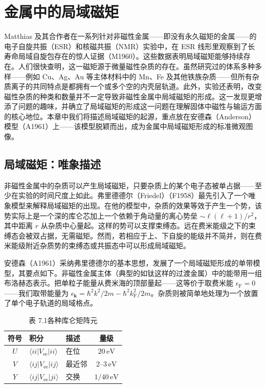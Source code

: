 \chapter{金属中的局域磁矩}

Matthias 及其合作者在一系列针对非磁性金属——即没有永久磁矩的金属——的电子自旋共振（ESR）和核磁共振（NMR）实验中，在 ESR 线形里观察到了长寿命局域自旋包存在的惊人证据（M1960）。这些数据表明局域磁矩能够持续存在。人们很快查明，这一磁矩源于微量磁性杂质的存在。虽然研究过的体系多种多样——例如 Cu、Ag、Au 等主体材料中的 Mn、Fe 及其他铁族杂质——但所有杂质离子的共同特点是都拥有一个或多个空的内壳层轨道。此外，实验还表明，改变磁性杂质的种类和数量并不一定导致非磁性金属中局域磁矩的形成。这一发现更增添了问题的趣味，并确立了局域磁矩的形成这一问题在理解固体中磁性与输运方面的核心地位。本章中我们将描述局域磁矩的起源，重点放在安德森（Anderson）模型（A1961）上——该模型脱颖而出，成为金属中局域磁矩形成的标准微观图像。

\section{局域磁矩：唯象描述}

非磁性金属中的杂质可以产生局域磁矩，只要杂质上的某个电子态被单占据——至少在实验的时间尺度上如此。弗里德德尔（Friedel）（F1958）最先引入了一个唯象模型来解释局域磁矩的出现。在他的模型中，杂质的效果等效于产生一个势，该势实际上是一个深的库仑芯加上一个依赖于角动量的离心势垒 $\sim\ell(\ell+1)/r^{2}$，其中距离 $r$ 从杂质中心量起。这样的势可以支撑束缚态。远在费米能级之下的束缚态会被双占据，无需磁矩。然而，若相应于上、下自旋的能级并不简并，则在费米能级附近杂质势的束缚态或共振态中可以形成局域磁矩。

安德森（A1961）采纳弗里德德尔的基本思想，发展了一个局域磁矩形成的单带模型，其要点如下。非磁性金属主体（典型的如钛这样的过渡金属）中的能带用一组布洛赫态表示。把单粒子能量从费米海的顶部量起——这等价于取费米能 $\epsilon_{\mathrm{F}}=0$——我们取带能量为 $\epsilon_{\mathbf{k}}=\hbar^{2}k^{2}/2m-\hbar^{2}k_{\mathrm{F}}^{2}/2m$。杂质则被简单地处理为一个放置了单个电子轨道的局域格点。

\begin{table}[H]\centering
\caption*{表 7.1\quad 各种库仑矩阵元}\label{tab:auto:7.1}
\begin{tabular}{cllc}
\toprule
符号 & 积分 & 描述 & 量级\\
\midrule
$U$ & $\langle ii|V_{\mathrm{ee}}|ii\rangle$ & 在位 & $20\,\mathrm{eV}$\\
$V$ & $\langle ij|V_{\mathrm{ee}}|ij\rangle$ & 最近邻 & $2$--$3\,\mathrm{eV}$\\
$Y$ & $\langle ij|V_{\mathrm{ee}}|ji\rangle$ & 交换 & $1/40\,\mathrm{eV}$\\
\bottomrule
\end{tabular}
\end{table}

